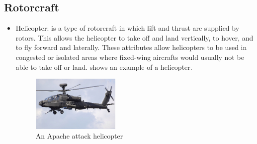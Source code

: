 \subsection{Rotorcraft}
\begin{itemize}
  \item Helicopter: is a type of rotorcraft in which lift and thrust are supplied by rotors. This allows the helicopter to take off and land vertically, to hover, and to fly forward and laterally. These attributes allow helicopters to be used in congested or isolated areas where fixed-wing aircrafts would usually not be able to take off or land. shows an example of a helicopter.

      \begin{figure}[h!]
        \centering
        \includegraphics[width=0.4\textwidth]{figures/apache.jpg}
        \caption{An Apache attack helicopter}\label{apache}
      \end{figure}


\end{itemize}
